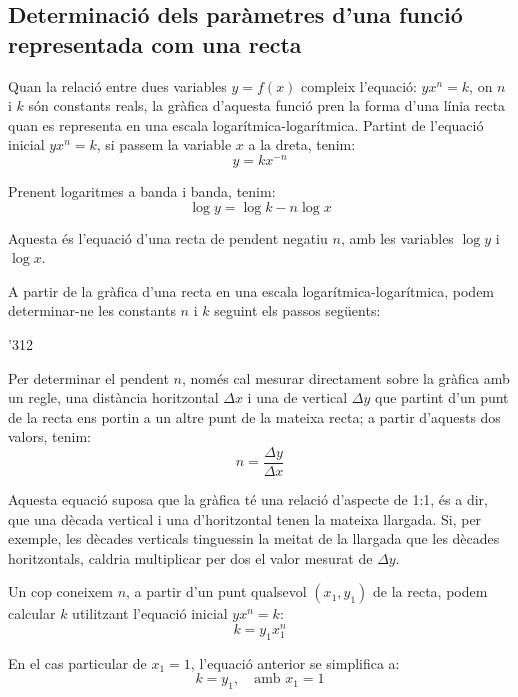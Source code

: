 \subsection{Determinació dels paràmetres d'una funció representada com una recta}\label{sec:escales-log-yxnk}

Quan la relació entre dues variables $y=f(x)$ compleix l'equació: $y x^n = k$, on $n$ i $k$  són constants  reals, la gràfica d'aquesta funció pren la forma d'una línia recta quan es representa en una escala logarítmica-logarítmica. Partint de l'equació inicial $y x^n = k$, si passem la variable $x$ a la dreta, tenim:
\begin{equation}
  y = k x^{-n}
\end{equation}

Prenent logaritmes a banda i banda, tenim:
\begin{equation}
  \log y = \log k - n \log x
\end{equation}

Aquesta és l'equació d'una recta de pendent negatiu $n$, amb les variables $\log y$ i $\log x$.

A partir de la gràfica d'una recta en una escala logarítmica-logarítmica, podem determinar-ne les constants $n$ i $k$ seguint els passos següents:

\begin{dingautolist}{'312}
    \item Per  determinar el pendent $n$, només cal mesurar directament sobre la gràfica amb un regle, una distància horitzontal $\Delta{}x$ i una de vertical $\Delta{}y$ que partint d'un punt de la recta ens portin a un altre punt de la mateixa recta; a partir d'aquests dos valors, tenim:
        \begin{equation}
          n = \frac{\Delta{}y}{\Delta{}x}
        \end{equation}

        Aquesta equació suposa que la gràfica té una relació d'aspecte de 1:1, és a dir, que una dècada vertical i una d'horitzontal tenen la mateixa llargada. Si, per exemple, les dècades verticals tinguessin la meitat de la llargada que les dècades  horitzontals, caldria multiplicar per dos el valor mesurat de $\Delta{}y$.

   \item  Un cop  coneixem $n$, a partir d'un punt qualsevol $(x_1, y_1)$ de la recta, podem calcular $k$ utilitzant l'equació inicial $y x^n = k$:
        \begin{equation}
          k =  y_1 x_1^n
        \end{equation}

        En el cas particular de $x_1=1$, l'equació anterior se simplifica a:\begin{equation}
           k = y_1, \quad \text{amb }x_1=1
        \end{equation}
\end{dingautolist}

